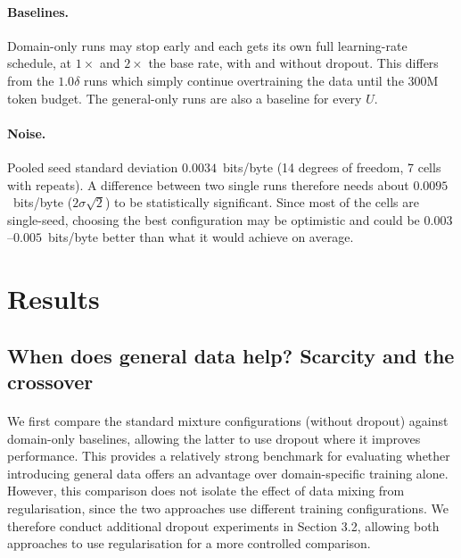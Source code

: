 \documentclass[10pt,a4paper]{article}
\newcommand{\bpb}{bits/byte}
\begin{document}
\paragraph{Baselines.} Domain-only runs may stop early and each gets its own full learning-rate schedule, at $1\times$ and $2\times$ the base rate, with and without dropout. This differs from the $1.0\delta$ runs which simply continue overtraining the data until the 300M token budget. The general-only runs are also a baseline for every $U$.

\paragraph{Noise.} Pooled seed standard deviation $0.0034$~\bpb{} (14 degrees of freedom, 7 cells with repeats). A difference between two single runs therefore needs about $0.0095$~\bpb{} ($2\sigma\sqrt{2}$) to be statistically significant. Since most of the cells are single-seed, choosing the best configuration may be optimistic and could be
$0.003$--$0.005$~\bpb{} better than what it would achieve on average.

\section{Results}
\subsection{When does general data help? Scarcity and the crossover}\label{sec:grid}
\paragraph{}We first compare the standard mixture configurations (without dropout) against domain-only baselines, allowing the latter to use dropout where it improves performance. This provides a relatively strong benchmark for evaluating whether introducing general data offers an advantage over domain-specific training alone. However, this comparison does not isolate the effect of data mixing from regularisation, since the two approaches use different training configurations. We therefore conduct additional dropout experiments in Section 3.2, allowing both approaches to use regularisation for a more controlled comparison.
\end{document}

